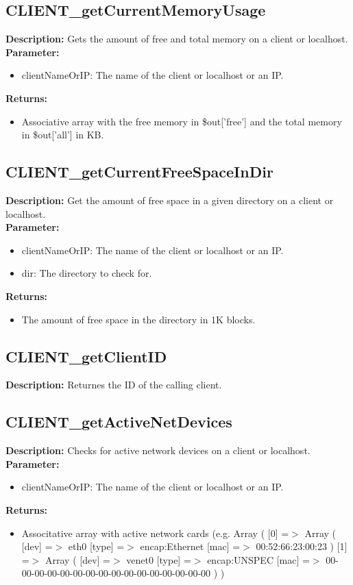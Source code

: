\subsection{CLIENT\_getCurrentMemoryUsage}
\textbf{Description:} Gets the amount of free and total memory on a client or localhost.\\
\textbf{Parameter:}
\begin{itemize}
\item clientNameOrIP: The name of the client or localhost or an IP.
\end{itemize}
\textbf{Returns:}
\begin{itemize}
\item Associative array with the free memory in \$out['free'] and the total memory in \$out['all'] in KB.
\end{itemize}

\subsection{CLIENT\_getCurrentFreeSpaceInDir}
\textbf{Description:} Get the amount of free space in a given directory on a client or localhost.\\
\textbf{Parameter:}
\begin{itemize}
\item clientNameOrIP: The name of the client or localhost or an IP.
\item dir: The directory to check for.
\end{itemize}
\textbf{Returns:}
\begin{itemize}
\item The amount of free space in the directory in 1K blocks.
\end{itemize}

\subsection{CLIENT\_getClientID}
\textbf{Description:} Returnes the ID of the calling client.\\

\subsection{CLIENT\_getActiveNetDevices}
\textbf{Description:} Checks for active network devices on a client or localhost.\\
\textbf{Parameter:}
\begin{itemize}
\item clientNameOrIP: The name of the client or localhost or an IP.
\end{itemize}
\textbf{Returns:}
\begin{itemize}
\item Associtative array with active network cards (e.g. Array ( [0] =$>$ Array ( [dev] =$>$ eth0 [type] =$>$ encap:Ethernet [mac] =$>$ 00:52:66:23:00:23 ) [1] =$>$ Array ( [dev] =$>$ venet0 [type] =$>$ encap:UNSPEC [mac] =$>$ 00-00-00-00-00-00-00-00-00-00-00-00-00-00-00-00 ) )
\end{itemize}

